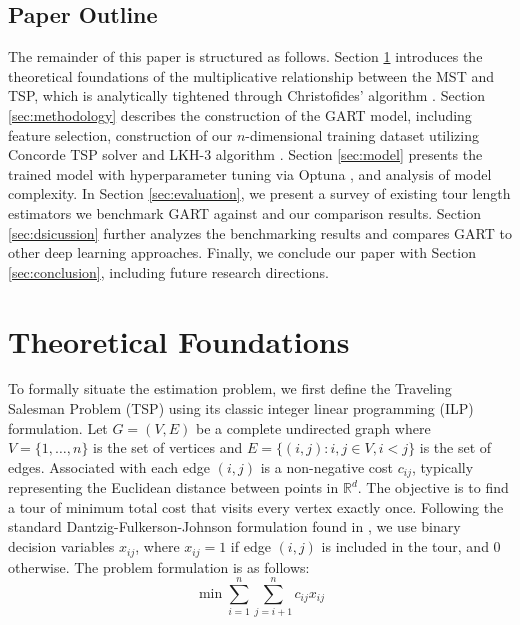 \documentclass{article}
\begin{document}
\subsection{Paper Outline}

The remainder of this paper is structured as follows. Section \ref{sec:theory} introduces the theoretical foundations of the multiplicative relationship between the MST and TSP, which is analytically tightened through Christofides' algorithm \citep{christofides2022worst}. 
Section \ref{sec:methodology} describes the construction of the GART model, including feature selection, construction of our $n$-dimensional training dataset utilizing Concorde TSP solver \citep{concorde2006} and LKH-3 algorithm \citep{helsgaun2017}. Section \ref{sec:model} presents the trained model with hyperparameter tuning via Optuna \citep{akiba2019optuna}, and analysis of model complexity. In Section \ref{sec:evaluation}, we present a survey of existing tour length estimators we benchmark GART against and our comparison results. 
Section \ref{sec:dsicussion} further analyzes the benchmarking results and compares GART to other deep learning approaches. Finally, we conclude our paper with Section \ref{sec:conclusion}, including future research directions. 

\section{Theoretical Foundations} \label{sec:theory}

To formally situate the estimation problem, we first define the Traveling Salesman Problem (TSP) using its classic integer linear programming (ILP) formulation. Let $G = (V, E)$ be a complete undirected graph where $V = \{1, \dots, n\}$ is the set of vertices and $E = \{(i, j) : i, j \in V, i < j\}$ is the set of edges. Associated with each edge $(i, j)$ is a non-negative cost $c_{ij}$, typically representing the Euclidean distance between points in $\mathbb{R}^d$. The objective is to find a tour of minimum total cost that visits every vertex exactly once. Following the standard Dantzig-Fulkerson-Johnson formulation found in \citet{concorde2006}, we use binary decision variables $x_{ij}$, where $x_{ij} = 1$ if edge $(i, j)$ is included in the tour, and $0$ otherwise. The problem formulation is as follows:
\begin{equation} \label{eq:tsp_obj}
    \min \sum_{i=1}^{n} \sum_{j=i+1}^{n} c_{ij} x_{ij}
\end{equation}
\end{document}
